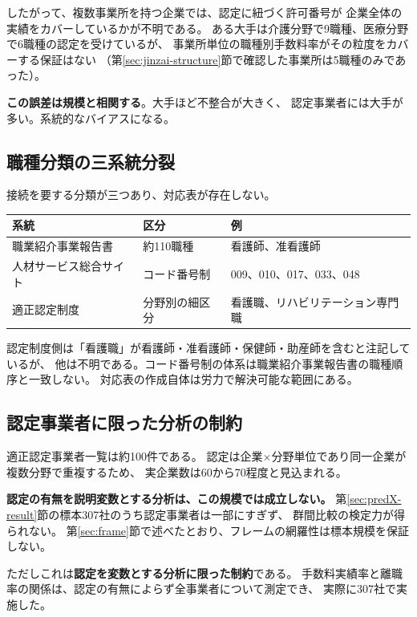 したがって、複数事業所を持つ企業では、認定に紐づく許可番号が
企業全体の実績をカバーしているかが不明である。
ある大手は介護分野で9職種、医療分野で6職種の認定を受けているが、
事業所単位の職種別手数料率がその粒度をカバーする保証はない
（第\ref{sec:jinzai-structure}節で確認した事業所は5職種のみであった）。

\textbf{この誤差は規模と相関する}。大手ほど不整合が大きく、
認定事業者には大手が多い。系統的なバイアスになる。

\subsection{職種分類の三系統分裂}

接続を要する分類が三つあり、対応表が存在しない。

\begin{center}
\begin{tabularx}{\textwidth}{@{}llX@{}}
\toprule
系統 & 区分 & 例 \\
\midrule
職業紹介事業報告書 & 約110職種 & 看護師、准看護師 \\
人材サービス総合サイト & コード番号制 & 009、010、017、033、048 \\
適正認定制度 & 分野別の細区分 & 看護職、リハビリテーション専門職 \\
\bottomrule
\end{tabularx}
\label{tab:occupation-classification-systems}
\end{center}

認定制度側は「看護職」が看護師・准看護師・保健師・助産師を含むと注記しているが、
他は不明である。コード番号制の体系は職業紹介事業報告書の職種順序と一致しない。
対応表の作成自体は労力で解決可能な範囲にある。

\subsection{認定事業者に限った分析の制約}
\label{sec:nintei-small}

適正認定事業者一覧は約100件である。
認定は企業$\times$分野単位であり同一企業が複数分野で重複するため、
実企業数は60から70程度と見込まれる。

\textbf{認定の有無を説明変数とする分析は、この規模では成立しない。}
第\ref{sec:predX-result}節の標本307社のうち認定事業者は一部にすぎず、
群間比較の検定力が得られない。
第\ref{sec:frame}節で述べたとおり、フレームの網羅性は標本規模を保証しない。

ただしこれは\textbf{認定を変数とする分析に限った制約}である。
手数料実績率と離職率の関係は、認定の有無によらず全事業者について測定でき、
実際に307社で実施した。

